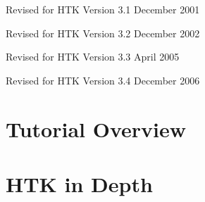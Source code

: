 \documentclass[a4paper,oneside]{book}
\begin{document}
{\vspace{0.1cm}





\noindent Revised for HTK Version 3.1 December 2001


\vspace{0.1cm}





\noindent Revised for HTK Version 3.2 December 2002


\vspace{0.1cm}





\noindent Revised for HTK Version 3.3 April 2005


\vspace{0.1cm}





\noindent Revised for HTK Version 3.4 December 2006


\vspace{0.1cm}


}







\newpage


\tableofcontents







\newpage


\pagestyle{myheadings}







\part{Tutorial Overview}














\part{HTK in Depth}



\end{document}
